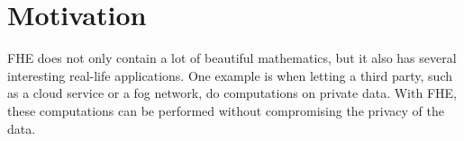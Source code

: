 







\section{Motivation}

FHE does not only contain a lot of beautiful mathematics, but it also has several interesting real-life applications. One example is when letting a third party, such as a cloud service or a fog network, do computations on private data. With FHE, these computations can be performed without compromising the privacy of the data.

